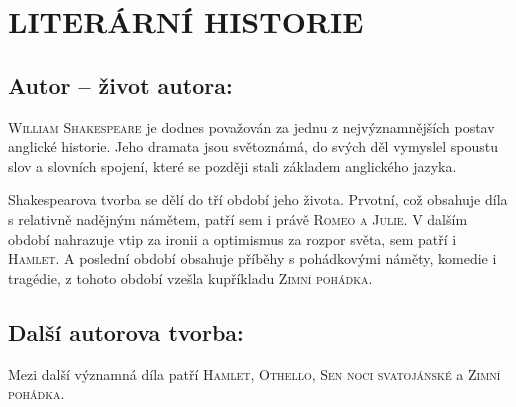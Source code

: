 \documentclass[A4paper]{extarticle} %
\begin{document}
\section*{LITERÁRNÍ HISTORIE}





\subsection*{Autor {\ssmall -- život autora:}}
\noindent 
\textsc{William Shakespeare} je dodnes považován za jednu z nejvýznamnějších postav anglické historie.
Jeho dramata jsou světoznámá, do svých děl vymyslel spoustu slov a slovních spojení, které se později stali základem anglického jazyka. \par
Shakespearova tvorba se dělí do tří období jeho života.
Prvotní, což obsahuje díla s relativně nadějným námětem, patří sem i právě \textsc{Romeo a Julie}.
V dalším období nahrazuje vtip za ironii a optimismus za rozpor světa, sem patří i \textsc{Hamlet}.
A poslední období obsahuje příběhy s pohádkovými náměty, komedie i tragédie, z tohoto období vzešla kupříkladu \textsc{Zimní pohádka}.


\subsection*{Další autorova tvorba:}
\noindent 
Mezi další významná díla patří \textsc{Hamlet}, \textsc{Othello}, \textsc{Sen noci svatojánské} a \textsc{Zimní pohádka}.
\end{document}
